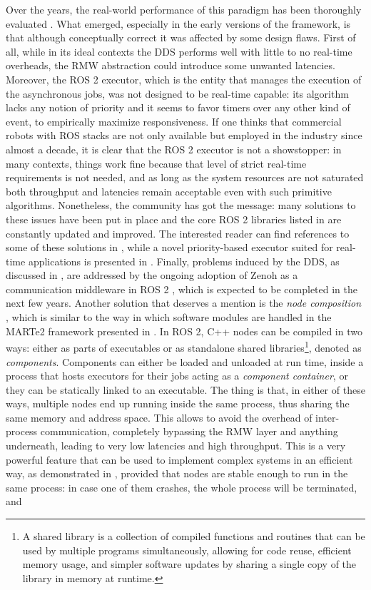 Over the years, the real-world performance of this paradigm has been thoroughly evaluated \cite{bedard_message_2023,maruyama_exploring_2016,puck_distributed_2020,kronauer_latency_2021}. What emerged, especially in the early versions of the framework, is that although conceptually correct it was affected by some design flaws. First of all, while in its ideal contexts the DDS performs well with little to no real-time overheads, the RMW abstraction could introduce some unwanted latencies. Moreover, the ROS 2 executor, which is the entity that manages the execution of the asynchronous jobs, was not designed to be real-time capable: its algorithm lacks any notion of priority and it seems to favor timers over any other kind of event, to empirically maximize responsiveness. If one thinks that commercial robots with ROS stacks are not only available but employed in the industry since almost a decade, it is clear that the ROS 2 executor is not a showstopper: in many contexts, things work fine because that level of strict real-time requirements is not needed, and as long as the system resources are not saturated both throughput and latencies remain acceptable even with such primitive algorithms. Nonetheless, the community has got the message: many solutions to these issues have been put in place and the core ROS 2 libraries listed in  are constantly updated and improved. The interested reader can find references to some of these solutions in \cite{bedard_message_2023}, while a novel priority-based executor suited for real-time applications is presented in \cite{staschulat_rclc_2020}. Finally, problems induced by the DDS, as discussed in , are addressed by the ongoing adoption of Zenoh as a communication middleware in ROS 2 \cite{open_robotics_ros_2023}, which is expected to be completed in the next few years. Another solution that deserves a mention is the \emph{node composition} \cite{macenski_impact_2023}, which is similar to the way in which software modules are handled in the MARTe2 framework presented in . In ROS 2, C++ nodes can be compiled in two ways: either as parts of executables or as standalone shared libraries\footnote{A shared library is a collection of compiled functions and routines that can be used by multiple programs simultaneously, allowing for code reuse, efficient memory usage, and simpler software updates by sharing a single copy of the library in memory at runtime.}, denoted as \emph{components}. Components can either be loaded and unloaded at run time, inside a process that hosts executors for their jobs acting as a \emph{component container}, or they can be statically linked to an executable. The thing is that, in either of these ways, multiple nodes end up running inside the same process, thus sharing the same memory and address space. This allows to avoid the overhead of inter-process communication, completely bypassing the RMW layer and anything underneath, leading to very low latencies and high throughput. This is a very powerful feature that can be used to implement complex systems in an efficient way, as demonstrated in \cite{macenski_impact_2023}, provided that nodes are stable enough to run in the same process: in case one of them crashes, the whole process will be terminated, and 